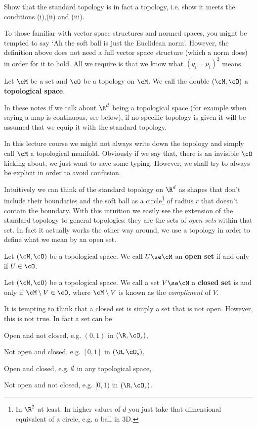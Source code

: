 \bbox
    Show that the standard topology is in fact a topology, i.e. show it meets the conditions (i),(ii) and (iii). 
\ebox

\br 
    To those familiar with vector space structures and normed spaces, you might be tempted to say `Ah the soft ball is just the Euclidean norm'. However, the definition above does not need a full vector space structure (which a norm does) in order for it to hold. All we require is that we know what $(q_i-p_i)^2$ means. 
\er 

    Let $\cM$ be a set and $\cO$ be a topology on $\cM$. We call the double $(\cM,\cO)$ a \textbf{topological space}.
\ed 

\br 
    In these notes if we talk about $\R^d$ being a topological space (for example when saying a map is continuous, see below), if no specific topology is given it will be assumed that we equip it with the standard topology.
\er 

\br 
    In this lecture course we might not always write down the topology and simply call $\cM$ a topological manifold. Obviously if we say that, there is an invisible $\cO$ kicking about, we just want to save some typing. However, we shall try to always be explicit in order to avoid confusion. 
\er 

Intuitively we can think of the standard topology on $\R^d$ as shapes that don't include their boundaries and the soft ball as a circle\footnote{In $\R^2$ at least. In higher values of $d$ you just take that dimensional equivalent of a circle, e.g. a ball in 3D. } of radius $r$ that doesn't contain the boundary. With this intuition we easily see the extension of the standard topology to general topologies: they are the sets of \textit{open sets} within that set. In fact it actually works the other way around, we use a topology in order to define what we mean by an open set. 

    Let $(\cM,\cO)$ be a topological space. We call $U\se\cM$ an \textbf{open set} if and only if $U\in \cO$.
\ed 

    Let $(\cM,\cO)$ be a topological space. We call a set $V\se\cM$ a \textbf{closed set} is and only if $\cM\setminus V \in \cO$, where $\cM\setminus V$ is known as the \textit{compliment} of $V$.
\ed 

\br 
    It is tempting to think that a closed set is simply a set that is not open. However, this is not true. In fact a set can be 
    \benr 
        \item Open and not closed, e.g. $(0,1)$ in $(\R,\cO_s)$,
        \item Not open and closed, e.g. $[0,1]$ in $(\R,\cO_s)$,
        \item Open and closed, e.g. $\emptyset$ in any topological space, 
        \item Not open and not closed, e.g. $[0,1)$ in $(\R,\cO_s)$. 
    \een 
\er 


